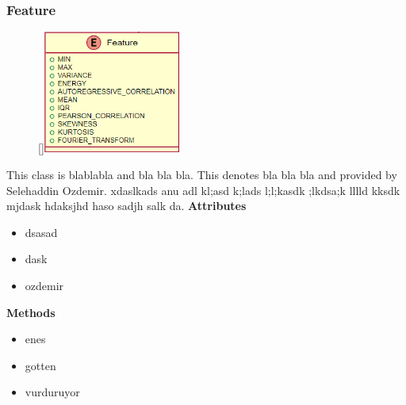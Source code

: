 \subsubsection{Feature}
\begin{figure}
    \raisebox{0pt}[\dimexpr{}\baselineskip\relax]{\includegraphics[width=4.5cm]{classes/model-management/6.png}}
\end{figure} 
\par
This class is blablabla and bla bla bla. This denotes bla bla bla and provided by Selehaddin Ozdemir. xdaslkads anu adl kl;asd k;lads l;l;kasdk ;lkdsa;k lllld kksdk mjdask hdaksjhd haso sadjh salk da.
\newline
\newline
\textbf{Attributes}
\begin{itemize}
    \item dsasad
    \item dask
    \item ozdemir
\end{itemize}
\textbf{Methods}
\begin{itemize}
    \item enes
    \item gotten
    \item vurduruyor
\end{itemize}

